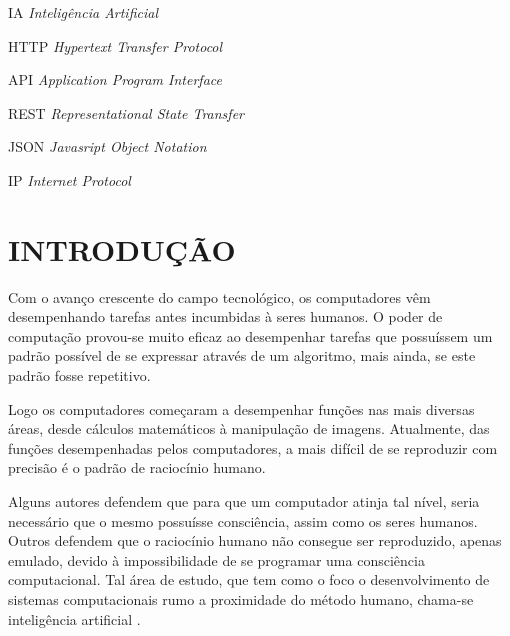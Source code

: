 \documentclass[12pt, openright, oneside, a4paper, brazil]{abntex2}
\begin{document}
\newpage %
\listofquadros* %
\cleardoublepage

\listoffigures*
\cleardoublepage

\begin{siglas}

	\item[IA]{\textit{Inteligência Artificial}}
	\item[HTTP]{\textit{Hypertext Transfer Protocol}}
	\item[API]{\textit{Application Program Interface}}
	\item[REST]{\textit{Representational State Transfer}}
	\item[JSON]{\textit{Javasript Object Notation}}
	\item[IP]\textit{Internet Protocol}

\end{siglas}

\tableofcontents*
\textual

\chapter{INTRODUÇÃO} \label{intro}

Com o avanço crescente do campo tecnológico, os computadores vêm desempenhando tarefas antes incumbidas à seres humanos. O poder de computação provou-se muito eficaz ao desempenhar tarefas que possuíssem um padrão possível de se expressar através de um algoritmo, mais ainda, se este padrão fosse repetitivo.

Logo os computadores começaram a desempenhar funções nas mais diversas áreas, desde cálculos matemáticos à manipulação de imagens. Atualmente, das funções desempenhadas pelos computadores, a mais difícil de se reproduzir com precisão é o padrão de raciocínio humano.

Alguns autores defendem que para que um computador atinja tal nível, seria necessário que o mesmo possuísse consciência, assim como os seres humanos. Outros defendem que o raciocínio humano não consegue ser reproduzido, apenas emulado, devido à impossibilidade de se programar uma consciência computacional. Tal área de estudo, que tem como o foco o desenvolvimento de sistemas computacionais rumo a proximidade do método humano, chama-se inteligência artificial \cite{russell2004inteligencia, coppin2015inteligencia}.
\end{document}
